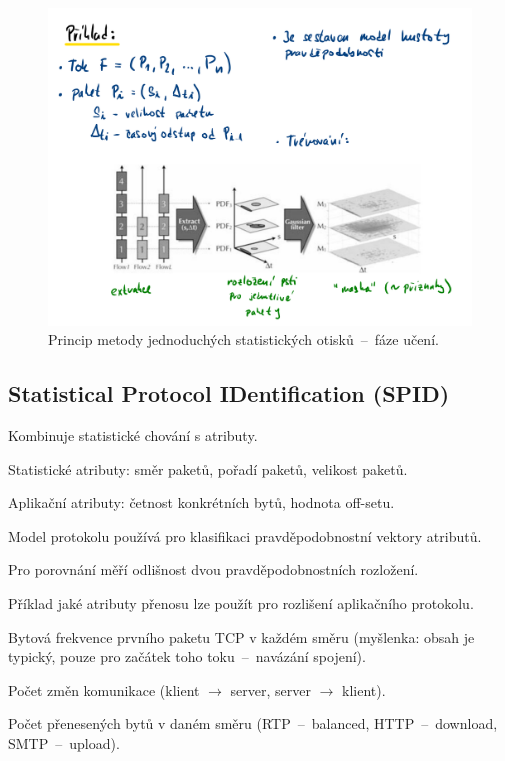 \begin{figure}[H]
    \centering
    \includegraphics[width=1\linewidth]{metoda_jednoduchych_statistickych_otisku_priklad.pdf}
    \caption{Princip metody jednoduchých statistických otisků~--~fáze učení.}
\end{figure}

\subsection*{Statistical Protocol IDentification (SPID)}

\begin{compactitem}
    \item Kombinuje statistické chování s atributy.
    \item Statistické atributy: směr paketů, pořadí paketů, velikost paketů.
    \item Aplikační atributy: četnost konkrétních bytů, hodnota off-setu.
    \item Model protokolu používá pro klasifikaci pravděpodobnostní vektory atributů.
    \item Pro porovnání měří odlišnost dvou pravděpodobnostních rozložení.
    \item Příklad jaké atributy přenosu lze použít pro rozlišení aplikačního protokolu. \begin{compactitem}
        \item Bytová frekvence prvního paketu TCP v každém směru (myšlenka: obsah je typický, pouze pro začátek toho toku~--~navázání spojení).
        \item Počet změn komunikace (klient $\rightarrow$ server, server $\rightarrow$ klient).
        \item Počet přenesených bytů v daném směru (RTP~--~balanced, HTTP~--~download, SMTP~--~upload).
    \end{compactitem}
\end{compactitem}

